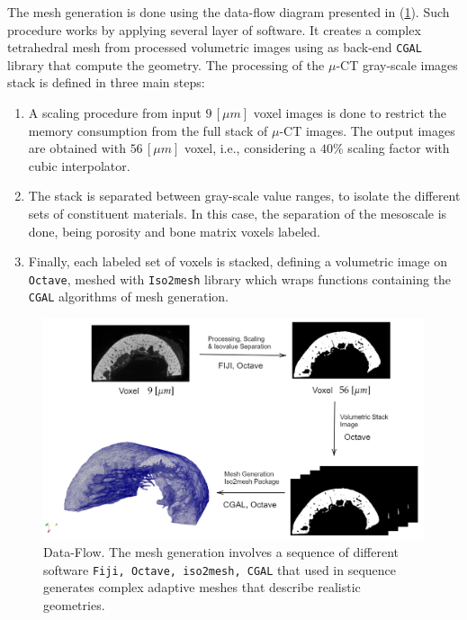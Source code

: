 The mesh generation is done using the data-flow diagram presented in (\ref{DiagramMeshGeneration}). Such procedure works by applying several layer of software. It creates a complex tetrahedral mesh from processed volumetric images using as back-end \texttt{CGAL} library that compute the geometry. 
The processing of the $\mu$-CT gray-scale images stack is defined in three main steps:
\begin{enumerate}
    \item A scaling procedure from input $9 \, [\mu m]$ voxel images is done to restrict the memory consumption from the full stack of $\mu$-CT images. The output images are obtained with $56 \, [\mu m]$ voxel, i.e., considering a $40 \%$ scaling factor with cubic interpolator.
    \item The stack is separated between gray-scale value ranges, to isolate the different sets of constituent materials. In this case, the separation of the mesoscale is done, being porosity and bone matrix voxels labeled.
    \item Finally, each labeled set of voxels is stacked, defining a volumetric image on \texttt{Octave}, meshed with \texttt{Iso2mesh} library which wraps functions containing the \texttt{CGAL} algorithms of mesh generation.
\end{enumerate}
\begin{figure}[!h]
	\centering
	\includegraphics[scale=.5]{images/ImgExt/DiagramMeshGeneration.png}
	\caption{Data-Flow. The mesh generation involves a sequence of different software \texttt{Fiji, Octave, iso2mesh, CGAL} that used in sequence generates complex adaptive meshes that describe realistic geometries.}
	\label{DiagramMeshGeneration}
\end{figure} 

